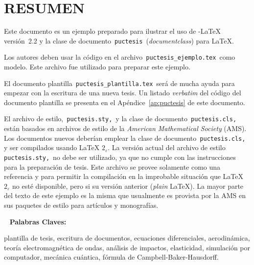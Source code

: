 \chapter*{RESUMEN}
Este documento es un ejemplo preparado para ilustrar el uso de \AmS-\LaTeX{} versi\'on~2.2 y la clase de documento \,\verb+puctesis+\, ({\em documentclass}) para \LaTeX.

Los autores deben usar la c\'odigo en el archivo \,\verb+puctesis_ejemplo.tex+\, como modelo.  Este archivo fue utilizado para preparar este ejemplo.

El documento plantilla \,\verb+puctesis_plantilla.tex+\, ser\'a de mucha ayuda para empezar con la escritura de una nueva tesis.  Un listado {\em verbatim} del c\'odigo del documento plantilla se presenta en el Ap\'endice~\ref{ap:puctesis} de este documento.

El archivo de estilo, \,\verb+puctesis.sty,+\, y la clase de documento \,\verb+puctesis.cls,+\, est\'an basados en archivos de estilo de la {\sl American Mathematical Society\/} (AMS).  Los documentos nuevos deber\'ian emplear la clase de documento \,\verb+puctesis.cls,+\, y ser compilados usando \LaTeX{} $2_\varepsilon$.  La versi\'on actual del archivo de estilo \,\verb+puctesis.sty,+\, no debe ser utilizado, ya que no cumple con las instrucciones para la preparaci\'on de tesis.  Este archivo se provee solamente como una referencia y para permitir la compilaci\'on en la improbable situaci\'on que \LaTeX{} $2_\varepsilon$ no est\'e disponible, pero si su versi\'on anterior ({\em plain} \LaTeX).  La mayor parte del texto de este ejemplo es la misma que usualmente es provista por la AMS en sus paquetes de estilo para art\'iculos y monograf\'ias.



~\vfill
{\bf Palabras Claves:} \parbox[t]{.75\textwidth}{plantilla de tesis,
  escritura de documentos, ecuaciones diferenciales, aerodin\'amica,
  teor\'ia electromagn\'etica de ondas, an\'alisis de impactos, elasticidad,
  simulaci\'on por computador, mec\'anica cu\'antica, 
  f\'ormula de \mbox{Campbell-Baker-Hausdorff}.
}